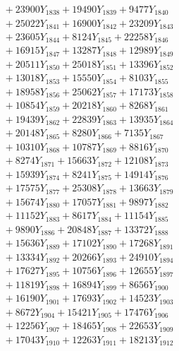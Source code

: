 \documentclass[a4paper,10pt]{article}
\begin{document}
{\begin{align}
&\;  + 23900 Y_{1838} + 19490 Y_{1839} + 9477 Y_{1840} \\[0.3ex]
&\;  + 25022 Y_{1841} + 16900 Y_{1842} + 23209 Y_{1843} \\[0.3ex]
&\;  + 23605 Y_{1844} + 8124 Y_{1845} + 22258 Y_{1846} \\[0.3ex]
&\;  + 16915 Y_{1847} + 13287 Y_{1848} + 12989 Y_{1849} \\[0.3ex]
&\;  + 20511 Y_{1850} + 25018 Y_{1851} + 13396 Y_{1852} \\[0.3ex]
&\;  + 13018 Y_{1853} + 15550 Y_{1854} + 8103 Y_{1855} \\[0.3ex]
&\;  + 18958 Y_{1856} + 25062 Y_{1857} + 17173 Y_{1858} \\[0.5ex]\allowbreak
&\;  + 10854 Y_{1859} + 20218 Y_{1860} + 8268 Y_{1861} \\[0.3ex]
&\;  + 19439 Y_{1862} + 22839 Y_{1863} + 13935 Y_{1864} \\[0.3ex]
&\;  + 20148 Y_{1865} + 8280 Y_{1866} + 7135 Y_{1867} \\[0.3ex]
&\;  + 10310 Y_{1868} + 10787 Y_{1869} + 8816 Y_{1870} \\[0.3ex]
&\;  + 8274 Y_{1871} + 15663 Y_{1872} + 12108 Y_{1873} \\[0.3ex]
&\;  + 15939 Y_{1874} + 8241 Y_{1875} + 14914 Y_{1876} \\[0.3ex]
&\;  + 17575 Y_{1877} + 25308 Y_{1878} + 13663 Y_{1879} \\[0.3ex]
&\;  + 15674 Y_{1880} + 17057 Y_{1881} + 9897 Y_{1882} \\[0.3ex]
&\;  + 11152 Y_{1883} + 8617 Y_{1884} + 11154 Y_{1885} \\[0.3ex]
&\;  + 9890 Y_{1886} + 20848 Y_{1887} + 13372 Y_{1888} \\[0.5ex]\allowbreak
&\;  + 15636 Y_{1889} + 17102 Y_{1890} + 17268 Y_{1891} \\[0.3ex]
&\;  + 13334 Y_{1892} + 20266 Y_{1893} + 24910 Y_{1894} \\[0.3ex]
&\;  + 17627 Y_{1895} + 10756 Y_{1896} + 12655 Y_{1897} \\[0.3ex]
&\;  + 11819 Y_{1898} + 16894 Y_{1899} + 8656 Y_{1900} \\[0.3ex]
&\;  + 16190 Y_{1901} + 17693 Y_{1902} + 14523 Y_{1903} \\[0.3ex]
&\;  + 8672 Y_{1904} + 15421 Y_{1905} + 17476 Y_{1906} \\[0.3ex]
&\;  + 12256 Y_{1907} + 18465 Y_{1908} + 22653 Y_{1909} \\[0.3ex]
&\;  + 17043 Y_{1910} + 12263 Y_{1911} + 18213 Y_{1912} \\[0.3ex]

\end{align}}
\end{document}
